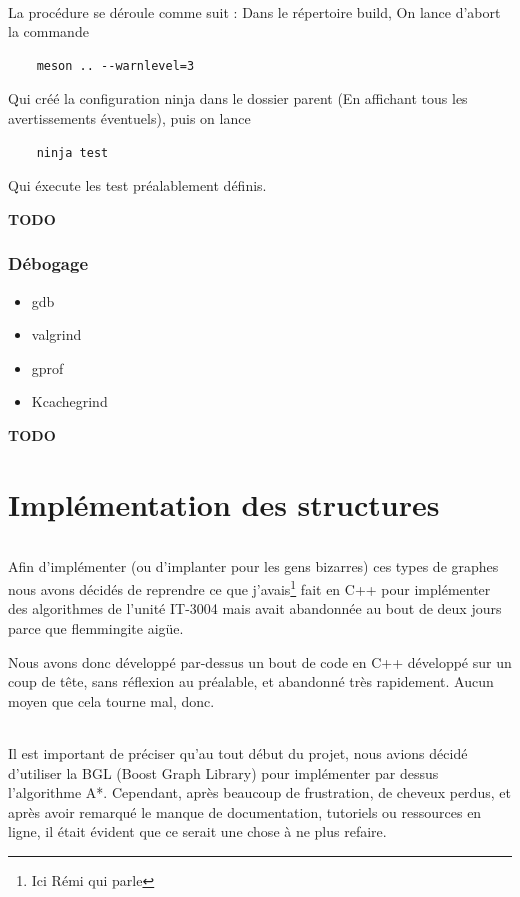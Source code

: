 \documentclass[french]{article}
\begin{document}
\paragraph{} La procédure se déroule comme suit : Dans le répertoire build, On lance d'abort la commande

\begin{verbatim}
	meson .. --warnlevel=3
\end{verbatim}

Qui créé la configuration ninja dans le dossier parent (En affichant tous les avertissements éventuels), puis on lance

\begin{verbatim}
	ninja test
\end{verbatim}

Qui éxecute les test préalablement définis.

\textbf{\Huge{TODO}}

\section{Débogage}

\begin{itemize}
	\item gdb
	\item valgrind
	\item gprof
	\item Kcachegrind
\end{itemize}

\textbf{\Huge{TODO}}

\part{Implémentation des structures}

\paragraph{} Afin d'implémenter (ou d'implanter pour les gens bizarres) ces
types de graphes nous avons décidés de reprendre ce que j'avais\footnote{Ici
	Rémi qui parle} fait en C++ pour implémenter des algorithmes de l'unité
IT-3004 mais avait abandonnée au bout de deux jours parce que flemmingite
aigüe.

Nous avons donc développé par-dessus un bout de code en C++ développé sur un
coup de tête, sans réflexion au préalable, et abandonné très rapidement. Aucun
moyen que cela tourne mal, donc.

\paragraph{} Il est important de préciser qu'au tout début du projet, nous
avions décidé d'utiliser la BGL (Boost Graph Library) pour implémenter par
dessus l'algorithme A*. Cependant, après beaucoup de frustration, de cheveux
perdus, et après avoir remarqué le manque de documentation, tutoriels ou
ressources en ligne, il était évident que ce serait une chose à ne plus
refaire.
\end{document}

